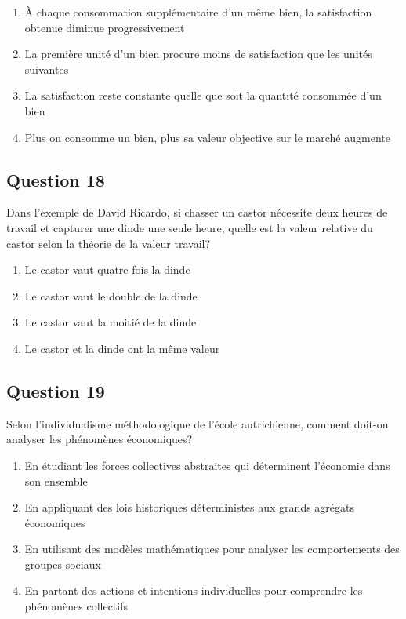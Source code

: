 \documentclass[12pt,a4paper]{article}
\begin{document}
\begin{enumerate}[label=\Alph*., leftmargin=*]
\item À chaque consommation supplémentaire d'un même bien, la satisfaction obtenue diminue progressivement
\item La première unité d'un bien procure moins de satisfaction que les unités suivantes
\item La satisfaction reste constante quelle que soit la quantité consommée d'un bien
\item Plus on consomme un bien, plus sa valeur objective sur le marché augmente
\end{enumerate}

\bigskip


\subsection*{Question 18}
Dans l'exemple de David Ricardo, si chasser un castor nécessite deux heures de travail et capturer une dinde une seule heure, quelle est la valeur relative du castor selon la théorie de la valeur travail?

\begin{enumerate}[label=\Alph*., leftmargin=*]
\item Le castor vaut quatre fois la dinde
\item Le castor vaut le double de la dinde
\item Le castor vaut la moitié de la dinde
\item Le castor et la dinde ont la même valeur
\end{enumerate}

\bigskip


\subsection*{Question 19}
Selon l'individualisme méthodologique de l'école autrichienne, comment doit-on analyser les phénomènes économiques?

\begin{enumerate}[label=\Alph*., leftmargin=*]
\item En étudiant les forces collectives abstraites qui déterminent l'économie dans son ensemble
\item En appliquant des lois historiques déterministes aux grands agrégats économiques
\item En utilisant des modèles mathématiques pour analyser les comportements des groupes sociaux
\item En partant des actions et intentions individuelles pour comprendre les phénomènes collectifs
\end{enumerate}
\end{document}
